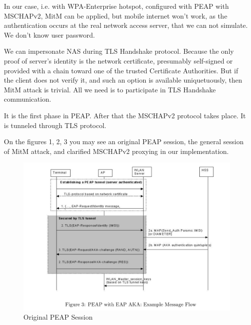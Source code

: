 \documentclass{amsart}
\begin{document}
In our case, i.e. with WPA-Enterprise hotspot,
configured with PEAP with MSCHAPv2, MitM can be applied,
but mobile internet won't work, as the authentication occurs at the real network
access server, that we can not simulate. We don't know user password.

We can impersonate NAS during TLS Handshake protocol.
Because the only proof of server's identity is the network certificate,
presumably self-signed or provided with a chain toward one of the trusted
Certificate Authorities. But if the client does not verify it,
and such an option is available uniquetuously,
then MitM attack is trivial.
All we need is to participate in TLS Handshake communication.

It is the first phase in PEAP. After that the MSCHAPv2 protocol takes place.
It is tunneled through TLS protocol.

On the figures 1, 2, 3 you may see an original PEAP session, the general
session of MitM attack, and clarified MSCHAPv2 proxying in our implementation.

\begin{figure}
  \centering \includegraphics{res/peap-session-fig.png}
  \caption{Original PEAP Session}
\end{figure}
\end{document}
